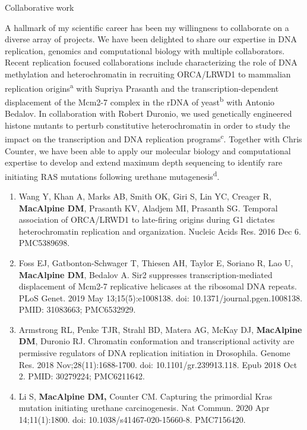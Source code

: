 
\item Collaborative work

\noindent A hallmark of my scientific career has been my willingness to collaborate on a diverse array of projects.  We have been delighted to share our expertise in DNA replication, genomics and computational biology with multiple collaborators.  Recent replication focused collaborations include characterizing the role of DNA methylation and heterochromatin in recruiting ORCA/LRWD1 to mammalian replication origins\textsuperscript{a} with Supriya Prasanth and the transcription-dependent displacement of the Mcm2-7 complex in the rDNA of yeast\textsuperscript{b} with Antonio Bedalov.  In collaboration with Robert Duronio, we used genetically engineered histone mutants to perturb constitutive heterochromatin in order to study the impact on the transcription and DNA replication programs\textsuperscript{c}.  Together with Chris Counter, we have been able to apply our molecular biology and computational expertise to develop and extend maximum depth sequencing to identify rare initiating RAS mutations following urethane mutagenesis\textsuperscript{d}.  



\begin{enumerate}
\setlength\itemsep{0.35em}


\item Wang Y, Khan A, Marks AB, Smith OK, Giri S, Lin YC, Creager R, \textbf{MacAlpine DM},
Prasanth KV, Aladjem MI, Prasanth SG. Temporal association of ORCA/LRWD1 to
late-firing origins during G1 dictates heterochromatin replication and
organization. Nucleic Acids Res. 2016 Dec 6. PMC5389698.


\item Foss EJ, Gatbonton-Schwager T, Thiesen AH, Taylor E, Soriano R, Lao U, \textbf{MacAlpine DM}, Bedalov A. Sir2 suppresses transcription-mediated displacement of Mcm2-7 replicative helicases at the ribosomal DNA repeats. PLoS Genet. 2019 May 13;15(5):e1008138. doi: 10.1371/journal.pgen.1008138. PMID: 31083663; PMC6532929.

\item Armstrong RL, Penke TJR, Strahl BD, Matera AG, McKay DJ, \textbf{MacAlpine DM}, Duronio RJ. Chromatin conformation and transcriptional activity are permissive regulators of DNA replication initiation in Drosophila. Genome Res. 2018 Nov;28(11):1688-1700. doi: 10.1101/gr.239913.118. Epub 2018 Oct 2. PMID: 30279224; PMC6211642.


\item Li S, \textbf{MacAlpine DM,} Counter CM. Capturing the primordial Kras mutation initiating urethane carcinogenesis. Nat Commun. 2020 Apr 14;11(1):1800. doi: 10.1038/s41467-020-15660-8. PMC7156420.

\end{enumerate}

